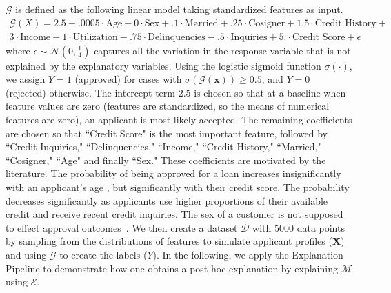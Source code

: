 \documentclass[12pt]{article}  %
\begin{document}
    $\mathcal{G}$ is defined as the following linear model taking standardized features as input. 
    \begin{equation}
    \label{eqn:gt}
    \begin{split}
    \mathcal{G}(X) =2.5 +.0005\cdot\text{Age} -0\cdot\text{Sex} +.1 \cdot \text{Married} + .25\cdot \text{Cosigner} + 1.5 \cdot \text{Credit History} + \\   3 \cdot \text{Income} - 1\cdot\text{Utilization} -.75 \cdot \text{Delinquencies} - .5\cdot\text{Inquiries} + 5.\cdot\text{Credit Score} + \epsilon
    \end{split}
    \end{equation}
    \noindent where $\epsilon \sim \mathcal{N}(0,\frac{1}{4})$ captures all the variation in the response variable that is not explained by the explanatory variables.
    Using the logistic sigmoid function $\sigma(\cdot)$, we assign $Y = 1$ (approved) for cases with $\sigma(\mathcal{G}(\mathbf{x}))\geq 0.5$, and $Y = 0$ (rejected) otherwise. The intercept term $2.5$ is chosen so that at a baseline when feature values are zero (features are standardized, so the means of numerical features are zero), an applicant is most likely accepted. The remaining coefficients are chosen so that ``Credit Score" is the most important feature, followed by ``Credit Inquiries," ``Delinquencies," ``Income," ``Credit History," ``Married," ``Cosigner," ``Age" and finally ``Sex." These coefficients are motivated by the literature. The probability of being approved for a loan increases insignificantly with an applicant's age \citep{cfb_age}, but significantly with their credit score. The probability decreases significantly as applicants use higher proportions of their available credit and receive recent credit inquiries. The sex of a customer is not supposed to effect approval outcomes~\citep{Calcagnini2014}. 
   We then create a dataset $\mathcal{D}$ with 5000 data points by sampling from the distributions of features to simulate applicant profiles ($\mathbf{X}$) and using $\mathcal{G}$ to create the labels ($Y$).  
   In the following, we apply the Explanation Pipeline to demonstrate how one obtains a post hoc explanation by explaining $\mathcal{M}$ using $\mathcal{E}$. 
\end{document}
